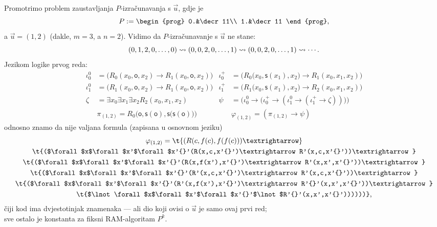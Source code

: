 \begin{primjer}[{name=[zaustavljanje RAM-izračunavanja kao valjanost jedne formule]}]
Promotrimo problem zaustavljanja $P$-izračunavanja s $\vec u$, gdje je
\begin{equation}
    P:=\begin{prog}
    0.&\decr11\\
    1.&\decr11
    \end{prog}\text,
\end{equation}
    a $\vec u=(1,2)$ (dakle, $m=3$, a $n=2$). Vidimo da $P$-izračunavanje s $\vec u$ ne stane:
\begin{equation}
    (0,1,2,0,\dotsc,0)\leadsto(0,0,2,0,\dotsc,1)\leadsto(0,0,2,0,\dotsc,1)\leadsto\dotsb\text.
\end{equation}
Jezikom logike prvog reda:
\begin{align}
	\iota_0^0&=\bigl(R_0(x_0,\mathsf o,x_2)\to R_1(x_0,\mathsf o,x_2)\bigr)&
    \iota_0^+&=\bigl(R_0\bigl(x_0,\mathsf s(x_1),x_2\bigr)\to R_1(x_0,x_1,x_2)\bigr)\\
	\iota_1^0&=\bigl(R_1(x_0,\mathsf o,x_2)\to R_1(x_0,\mathsf o,x_2)\bigr)&
    \iota_1^+&=\bigl(R_1\bigl(x_0,\mathsf s(x_1),x_2\bigr)\to R_2(x_0,x_1,x_2)\bigr)\\
	\zeta&=\exists x_0\exists x_1\exists x_2 R_2(x_0,x_1,x_2)&
    \psi&=\bigl(\iota_0^0\to\bigl(\iota_0^+\to(\iota_1^0\to(\iota_1^+\to\zeta))\bigl)\bigl)\\
	&\pi_{(1,2)}=R_0\bigl(\mathsf o,\mathsf s(\mathsf o),\mathsf s\bigl(\mathsf s(\mathsf o)\bigr)\bigr)&
	&\varphi_{(1,2)}=(\pi_{(1,2)}\to\psi)
\end{align}
    odnosno znamo da nije valjana formula (zapisana u osnovnom jeziku)
\begin{multline}
    \varphi_{(1,2)}=\t{(R(c,f(c),f(f(c)))\textrightarrow}\\
    \t{($\forall$x$\forall$x'$\forall$x'{}'(R(x,c,x'{}')\textrightarrow R'(x,c,x'{}'))\textrightarrow}\\
    \t{($\forall$x$\forall$x'$\forall$x'{}'(R(x,f(x'),x'{}')\textrightarrow R'(x,x',x'{}'))\textrightarrow}\\
    \t{($\forall$x$\forall$x'$\forall$x'{}'(R'(x,c,x'{}')\textrightarrow R'(x,c,x'{}'))\textrightarrow}\\
    \t{($\forall$x$\forall$x'$\forall$x'{}'(R'(x,f(x'),x'{}')\textrightarrow R'{}'(x,x',x'{}'))\textrightarrow}\\
    \t{$\lnot\forall$x$\forall$x'$\forall$x'{}'$\lnot$R'{}'(x,x',x'{}'))))))}\text,
\end{multline}
čiji kod ima dvjestotinjak znamenaka --- ali dio koji ovisi o $\vec u$ je samo ovaj prvi red;\\ sve ostalo je konstanta za fiksni RAM-algoritam $P^k$.
\end{primjer}

